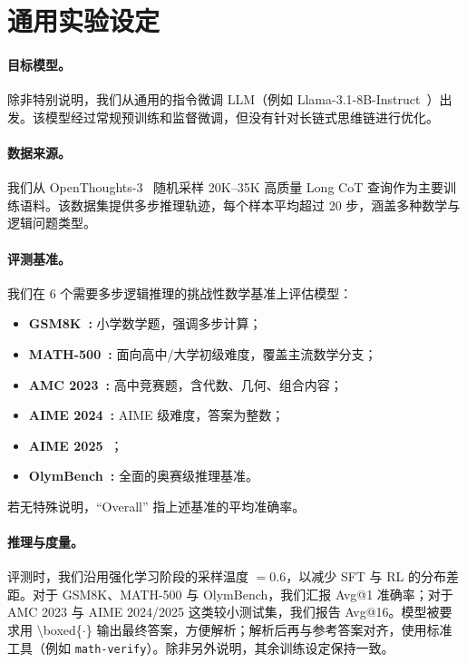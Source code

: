 \section{通用实验设定}
\paragraph{\textbf{目标模型。}} 除非特别说明，我们从通用的指令微调 LLM（例如 Llama-3.1-8B-Instruct~\citep{dubey2024llama}）出发。该模型经过常规预训练和监督微调，但没有针对长链式思维链进行优化。\vspace{-5pt}

\paragraph{\textbf{数据来源。}} 我们从 OpenThoughts-3~\citep{guha2025openthoughts} 随机采样 20K--35K 高质量 Long CoT 查询作为主要训练语料。该数据集提供多步推理轨迹，每个样本平均超过 20 步，涵盖多种数学与逻辑问题类型。\vspace{-5pt}

\paragraph{\textbf{评测基准。}} 我们在 6 个需要多步逻辑推理的挑战性数学基准上评估模型：
\begin{itemize}[leftmargin=16pt, itemsep=0pt, topsep=0pt]
  \item \textbf{GSM8K~\citep{cobbe2021training}:} 小学数学题，强调多步计算；
  \item \textbf{MATH-500~\citep{hendrycks2021measuring}:} 面向高中/大学初级难度，覆盖主流数学分支；
  \item \textbf{AMC 2023~\citep{amc2023}:} 高中竞赛题，含代数、几何、组合内容；
  \item \textbf{AIME 2024~\citep{aime2024}:} AIME 级难度，答案为整数；
  \item \textbf{AIME 2025~\citep{aime2025}}；
  \item \textbf{OlymBench~\citep{he2024olympiadbench}:} 全面的奥赛级推理基准。
\end{itemize}
若无特殊说明，“Overall” 指上述基准的平均准确率。\vspace{-5pt}

\paragraph{\textbf{推理与度量。}}
评测时，我们沿用强化学习阶段的采样温度 $=0.6$，以减少 SFT 与 RL 的分布差距。对于 GSM8K、MATH-500 与 OlymBench，我们汇报 Avg@1 准确率；对于 AMC 2023 与 AIME 2024/2025 这类较小测试集，我们报告 Avg@16。模型被要求用 $\setminus$boxed\{$\cdot$\} 输出最终答案，方便解析；解析后再与参考答案对齐，使用标准工具（例如 \texttt{math-verify}）。除非另外说明，其余训练设定保持一致。



